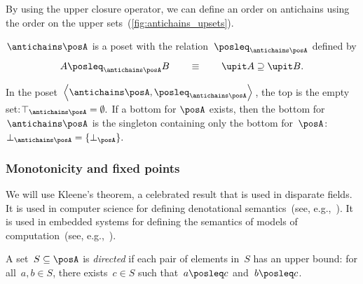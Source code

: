 
By using the upper closure operator, we can define an order on antichains
using the order on the upper sets~(\cref{fig:antichains_upsets}).
\begin{lemma}
\label{lem:antichains-are-poset}$\antichains\posA$ is a poset with
the relation~$\posleq_{\antichains\posA}$ defined by
\[
A\posleq_{\antichains\posA}B\qquad\equiv\qquad\upit A\supseteq\upit B.
\]
\end{lemma}
In the poset $\left\langle \antichains\posA,\posleq_{\antichains\posA}\right\rangle $,
the top is the empty set:$\top_{\antichains\posA}=\emptyset.$ If
a bottom for $\posA$ exists, then the bottom for~$\antichains\posA$
is the singleton containing only the bottom for~$\posA$: $\bot_{\antichains\posA}=\{\bot_{\posA}\}.$


\subsubsection{Monotonicity and fixed points\label{sec:Monotonicity-and-fixed}}

We will use Kleene's theorem, a celebrated result that is used in
disparate fields. It is used in computer science for defining denotational
semantics~(see, e.g.,~\cite{manes86}). It is used in embedded systems
for defining the semantics of models of computation~(see, e.g.,~\cite{lee10}).

\begin{definition}
A set~$S\subseteq\posA$ is \emph{directed} if each pair of elements
in~$S$ has an upper bound: for all~$a,b\in S$, there exists~$c\in S$
such that~$a\posleq c$ and~$b\posleq c$. 
\end{definition}


